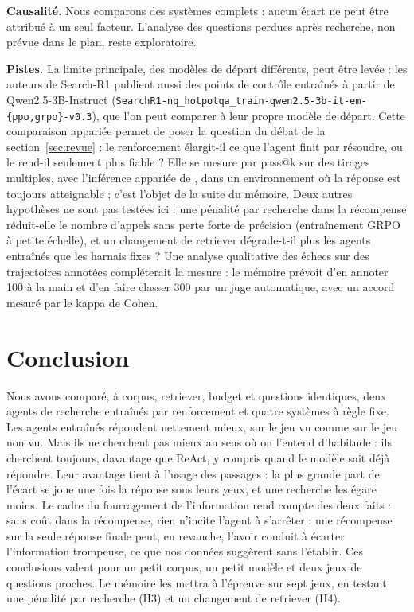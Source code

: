 \noindent\textbf{Causalité.} Nous comparons des systèmes complets : aucun écart ne peut être attribué à un seul facteur. L'analyse des questions perdues après recherche, non prévue dans le plan, reste exploratoire.

\textbf{Pistes.} La limite principale, des modèles de départ différents, peut être levée : les auteurs de Search-R1 publient aussi des points de contrôle entraînés à partir de Qwen2.5-3B-Instruct (\texttt{SearchR1-nq\_hotpotqa\_train-qwen2.5-3b-it-em-\{ppo,grpo\}-v0.3}), que l'on peut comparer à leur propre modèle de départ. Cette comparaison appariée permet de poser la question du débat de la section~\ref{sec:revue} : le renforcement élargit-il ce que l'agent finit par résoudre, ou le rend-il seulement plus fiable ? Elle se mesure par pass@k sur des tirages multiples, avec l'inférence appariée de \citet{yang2026crossovers}, dans un environnement où la réponse est toujours atteignable ; c'est l'objet de la suite du mémoire. Deux autres hypothèses ne sont pas testées ici : une pénalité par recherche dans la récompense réduit-elle le nombre d'appels sans perte forte de précision (entraînement GRPO à petite échelle), et un changement de retriever dégrade-t-il plus les agents entraînés que les harnais fixes ? Une analyse qualitative des échecs sur des trajectoires annotées compléterait la mesure : le mémoire prévoit d'en annoter 100 à la main et d'en faire classer 300 par un juge automatique, avec un accord mesuré par le kappa de Cohen.

\FloatBarrier
\section{Conclusion}\label{sec:conclusion}
Nous avons comparé, à corpus, retriever, budget et questions identiques, deux agents de recherche entraînés par renforcement et quatre systèmes à règle fixe. Les agents entraînés répondent nettement mieux, sur le jeu vu comme sur le jeu non vu. Mais ils ne cherchent pas mieux au sens où on l'entend d'habitude : ils cherchent toujours, davantage que ReAct, y compris quand le modèle sait déjà répondre. Leur avantage tient à l'usage des passages : la plus grande part de l'écart se joue une fois la réponse sous leurs yeux, et une recherche les égare moins. Le cadre du fourragement de l'information rend compte des deux faits : sans coût dans la récompense, rien n'incite l'agent à s'arrêter ; une récompense sur la seule réponse finale peut, en revanche, l'avoir conduit à écarter l'information trompeuse, ce que nos données suggèrent sans l'établir. Ces conclusions valent pour un petit corpus, un petit modèle et deux jeux de questions proches. Le mémoire les mettra à l'épreuve sur sept jeux, en testant une pénalité par recherche (H3) et un changement de retriever (H4).

